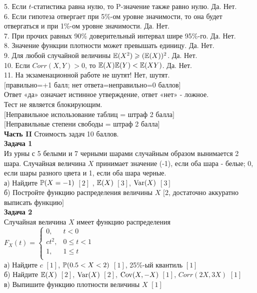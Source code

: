 \documentclass[12pt, a4paper]{article}\usepackage[]{graphicx}\usepackage[]{color}
\begin{document}
	5. Если $t$-статистика равна нулю, то P-значение также равно
	нулю. Да. Нет. \\

	6. Если гипотеза отвергает при 5\%-ом уровне значимости, то
	она будет отвергаться и при 1\%-ом уровне значимости. Да. Нет. \\

	7. При прочих равных 90\% доверительный интервал шире 95\%-го. Да. Нет. \\

	8. Значение функции плотности может превышать единицу. Да. Нет. \\

	9. Для любой случайной величины  $\E(X^{2} )\ge
	(\E(X))^{2}$. Да. Нет. \\

	10. Если $Corr(X,Y)>0$, то $\E(X)\E(Y)<\E(XY)$. Да. Нет. \\

	11. На экзаменационной работе не шутят! Нет, шутят. \\


	$[$правильно=+1 балл; нет ответа=неправильно=0 баллов$]$ \\
	Ответ «да» означает истинное утверждение, ответ «нет» - ложное. \\
	Тест не является блокирующим. \\

	$[$Неправильное использование таблиц = штраф 2 балла$]$ \\
	$[$Неправильные степени свободы = штраф 2 балла$]$ \\

	\textbf{Часть II} Стоимость задач 10 баллов. \\


	\textbf{Задача 1} \\ %
	Из урны с 5 белыми и 7 черными шарами случайным образом вынимается
	2 шара. Случайная величина $X$ принимает значение (-1), если оба
	шара - белые; 0, если шары разного цвета и 1, если оба шара
	черные. \\
	а) Найдите $\P(X=-1)$ $[2]$ , $\E(X)$ $[3]$, $\Var(X)$ $[3]$ \\
	б) Постройте функцию распределения величины $X$ $[2$, достаточно аккуратно выписать функцию$]$ \\



	\textbf{Задача 2} \\ %
	Случайная величина $X$ имеет функцию распределения
	$F_{X}(t)=\left\{\begin{array}{ll}
	0, & t<0 \\
	ct^{2}, & 0\le t <1 \\
	1, & 1\le t \\
	\end{array} \right.$ \\
	а) Найдите $c$ $[1]$, $\P(0.5<X<2)$ $[1]$, 25\%-ый квантиль $[1]$ \\
	б) Найдите $\E(X)$ $[2]$, $\Var(X)$ $[2]$, $\Cov(X,-X)$ $[1]$, $Corr(2X,3X)$ $[1]$ \\
	в) Выпишите функцию плотности величины $X$ $[1]$ \\
\end{document}

